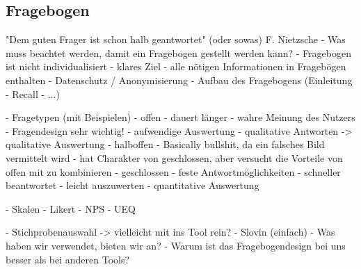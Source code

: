 \subsection{Fragebogen}
"Dem guten Frager ist schon halb geantwortet" (oder sowas) F. Nietzsche
- Was muss beachtet werden, damit ein Fragebogen gestellt werden kann?
  - Fragebogen ist nicht individualisiert
  - klares Ziel 
  - alle nötigen Informationen in Fragebögen enthalten
  - Datenschutz / Anonymisierung 
  - Aufbau des Fragebogens (Einleitung - Recall - ...)

- Fragetypen (mit Beispielen)
  - offen 
    - dauert länger
    - wahre Meinung des Nutzers 
    - Fragendesign sehr wichtig! 
    - aufwendige Auswertung 
    - qualitative Antworten -> qualitative Auswertung
  - halboffen
    - Basically bullshit, da ein falsches Bild vermittelt wird
    - hat Charakter von geschlossen, aber versucht die Vorteile von offen mit zu kombinieren
  - geschlossen
    - feste Antwortmöglichkeiten
    - schneller beantwortet
    - leicht auszuwerten
    - quantitative Auswertung

- Skalen
  - Likert
  - NPS
  - UEQ

- Stichprobenauswahl -> vielleicht mit ins Tool rein?
  - Slovin (einfach)
- Was haben wir verwendet, bieten wir an?
- Warum ist das Fragebogendesign bei uns besser als bei anderen Tools?
